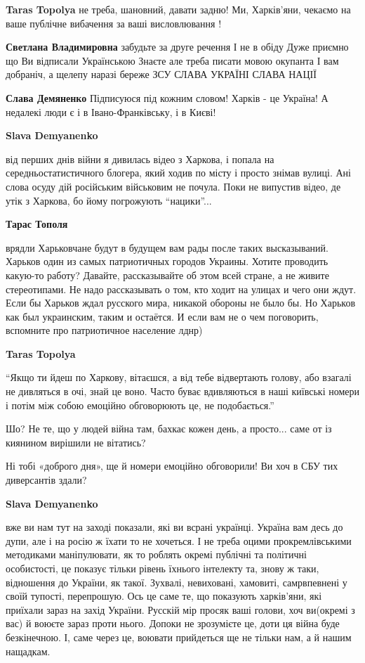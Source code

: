\begin{itemize}
\begin{itemize}
\textbf{Taras Topolya} не треба, шановний, давати задню!
Ми, Харків'яни, чекаємо на ваше публічне вибачення за ваші висловлювання !

\textbf{Светлана Владимировна} забудьте за друге речення
І не в обіду
Дуже приємно що Ви відписали Українською
Знаєте але треба писати мовою окупанта
І вам добраніч, а щелепу наразі береже ЗСУ
СЛАВА УКРАЇНІ
СЛАВА НАЦІЇ

\textbf{Слава Демяненко} Підписуюся під кожним словом! Харків - це Україна! А недалекі люди є і в Івано-Франківську, і в Києві!

\textbf{Slava Demyanenko} 

від перших днів війни я дивилась відео з Харкова, і попала на
середньостатистичного блогера, який ходив по місту і просто знімав вулиці. Ані
слова осуду дій російським військовим не почула. Поки не випустив відео, де
утік з Харкова, бо йому погрожують \enquote{нацики}...

\textbf{Тарас Тополя} 

врядли Харьковчане будут в будущем вам рады после таких высказываний. Харьков
один из самых патриотичных городов Украины. Хотите проводить какую-то работу?
Давайте, рассказывайте об этом всей стране, а не живите стереотипами. Не надо
рассказывать о том, кто ходит на улицах и чего они ждут. Если бы Харьков ждал
русского мира, никакой обороны не было бы. Но Харьков как был украинским, таким
и остаётся. И если вам не о чем поговорить, вспомните про патриотичное
население лднр)

\textbf{Taras Topolya} 

\enquote{Якщо ти йдеш по Харкову, вітаєшся, а від тебе відвертають голову, або взагалі
не дивляться в очі, знай це воно. Часто буває вдивляються в наші київські
номери і потім між собою емоційно обговорюють це, не подобається.}

Шо? Не те, що у людей війна там, бахкає кожен день, а просто... саме от із
киянином вирішили не вітатись?

Ні тобі «доброго дня», ще й номери емоційно обговорили! Ви хоч в СБУ тих
диверсантів здали?

\textbf{Slava Demyanenko} 

вже ви нам тут на заході показали, які ви всрані українці. Україна вам десь до
дупи, але і на росію ж їхати то не хочеться. І не треба оцими прокремлівськими
методиками маніпулювати, як то роблять окремі публічні та політичні
особистості, це показує тільки рівень їхнього інтелекту та, знову ж таки,
відношення до України, як такої. Зухвалі, невиховані, хамовиті, самрвпевнені у
своїй тупості, перепрошую. Ось це саме те, що показують харків'яни, які
приїхали зараз на захід України. Русскій мір просяк ваші голови, хоч ви(окремі
з вас) й воюєте зараз проти нього. Допоки не зрозумієте це, доти ця війна буде
безкінечною. І, саме через це, воювати прийдеться ще не тільки нам, а й нашим
нащадкам.


\end{itemize}
\end{itemize}
